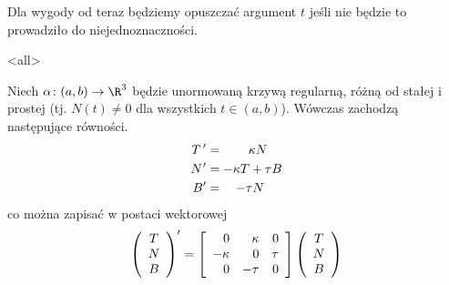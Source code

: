 \begin{frame}[<+->]

\begin{uwaga}
Dla wygody od teraz będziemy opuszczać argument $t$ jeśli nie będzie to prowadziło do niejednoznaczności.
\end{uwaga}

\end{frame}
\mode<all>{}
\begin{frame}
\begin{twierdzenie} Niech $\alpha\colon (a,b)\to \R^3$ będzie unormowaną krzywą regularną, r\'ożną od stałej i prostej (tj. $N(t)\neq 0$ dla wszystkich $t\in (a,b)$). Wówczas zachodzą następujące równości.
\begin{align}
T\,'	&= \qquad\kappa N \label{eqn:frenet1} \\
N\hspace{0.5pt}'	&= -\kappa T + \tau B\label{eqn:frenet2}\\
B'	&= \quad-\tau N\label{eqn:frenet3}
\end{align}
\pause co można zapisać w postaci wektorowej
\[
\left(\begin{array}{c}
 T\\
 N\\
 B
 \end{array}\right)'=
 \left[\begin{array}{r r r}
 0 & \kappa & 0\\
 -\kappa & 0 & \tau\\
 0 & -\tau &0
 \end{array}\right]
 \left(\begin{array}{c}
  T\\
 N\\
 B
 \end{array}\right)
\]


\end{twierdzenie}

\end{frame}
